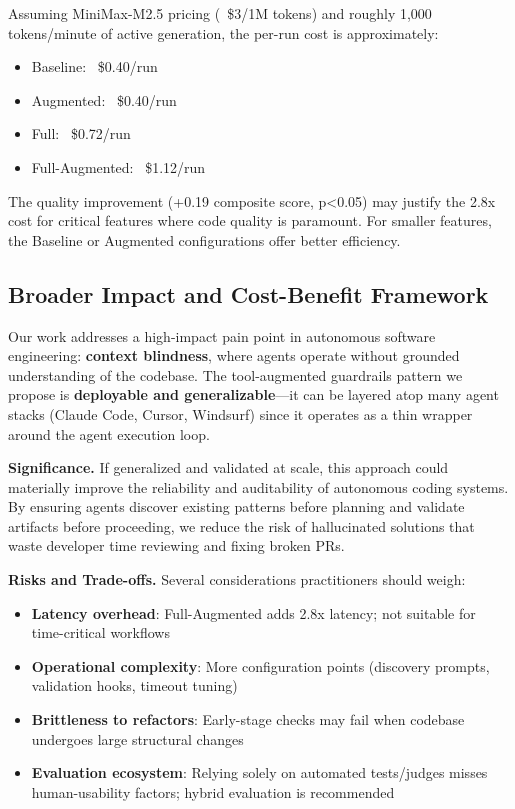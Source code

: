 \documentclass[sigconf,anonymous,review]{acmart}
\begin{document}
Assuming MiniMax-M2.5 pricing (~\$3/1M tokens) and roughly 1,000 tokens/minute of active generation, the per-run cost is approximately:
\begin{itemize}
  \item Baseline: ~\$0.40/run
  \item Augmented: ~\$0.40/run
  \item Full: ~\$0.72/run
  \item Full-Augmented: ~\$1.12/run
\end{itemize}

The quality improvement (+0.19 composite score, p<0.05) may justify the 2.8x cost for critical features where code quality is paramount. For smaller features, the Baseline or Augmented configurations offer better efficiency.

\subsection{Broader Impact and Cost-Benefit Framework}

Our work addresses a high-impact pain point in autonomous software engineering: \textbf{context blindness}, where agents operate without grounded understanding of the codebase. The tool-augmented guardrails pattern we propose is \textbf{deployable and generalizable}---it can be layered atop many agent stacks (Claude Code, Cursor, Windsurf) since it operates as a thin wrapper around the agent execution loop.

\textbf{Significance.} If generalized and validated at scale, this approach could materially improve the reliability and auditability of autonomous coding systems. By ensuring agents discover existing patterns before planning and validate artifacts before proceeding, we reduce the risk of hallucinated solutions that waste developer time reviewing and fixing broken PRs.

\textbf{Risks and Trade-offs.} Several considerations practitioners should weigh:

\begin{itemize}
  \item \textbf{Latency overhead}: Full-Augmented adds 2.8x latency; not suitable for time-critical workflows
  \item \textbf{Operational complexity}: More configuration points (discovery prompts, validation hooks, timeout tuning)
  \item \textbf{Brittleness to refactors}: Early-stage checks may fail when codebase undergoes large structural changes
  \item \textbf{Evaluation ecosystem}: Relying solely on automated tests/judges misses human-usability factors; hybrid evaluation is recommended
\end{itemize}
\end{document}

